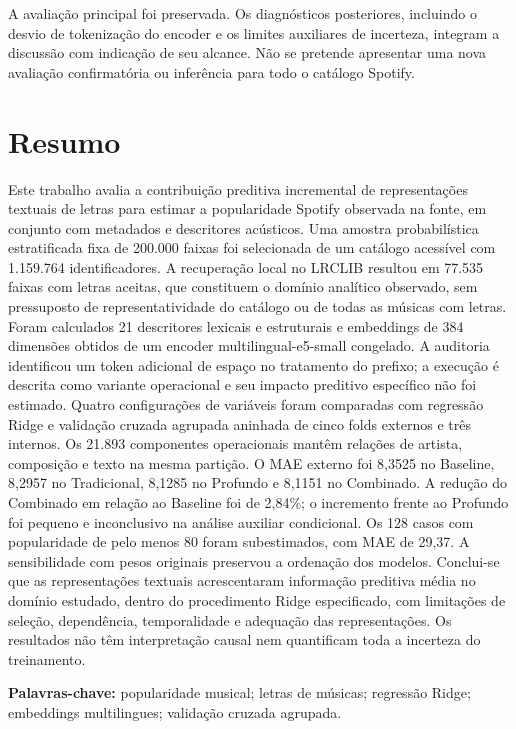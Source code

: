 A avaliação principal foi preservada. Os diagnósticos posteriores, incluindo o desvio de tokenização do encoder e os limites auxiliares de incerteza, integram a discussão com indicação de seu alcance. Não se pretende apresentar uma nova avaliação confirmatória ou inferência para todo o catálogo Spotify.

\chapter*{Resumo}
Este trabalho avalia a contribuição preditiva incremental de representações textuais de letras para estimar a popularidade Spotify observada na fonte, em conjunto com metadados e descritores acústicos. Uma amostra probabilística estratificada fixa de 200.000 faixas foi selecionada de um catálogo acessível com 1.159.764 identificadores. A recuperação local no LRCLIB resultou em 77.535 faixas com letras aceitas, que constituem o domínio analítico observado, sem pressuposto de representatividade do catálogo ou de todas as músicas com letras. Foram calculados 21 descritores lexicais e estruturais e embeddings de 384 dimensões obtidos de um encoder multilingual-e5-small congelado. A auditoria identificou um token adicional de espaço no tratamento do prefixo; a execução é descrita como variante operacional e seu impacto preditivo específico não foi estimado. Quatro configurações de variáveis foram comparadas com regressão Ridge e validação cruzada agrupada aninhada de cinco folds externos e três internos. Os 21.893 componentes operacionais mantêm relações de artista, composição e texto na mesma partição. O MAE externo foi 8,3525 no Baseline, 8,2957 no Tradicional, 8,1285 no Profundo e 8,1151 no Combinado. A redução do Combinado em relação ao Baseline foi de 2,84\%; o incremento frente ao Profundo foi pequeno e inconclusivo na análise auxiliar condicional. Os 128 casos com popularidade de pelo menos 80 foram subestimados, com MAE de 29,37. A sensibilidade com pesos originais preservou a ordenação dos modelos. Conclui-se que as representações textuais acrescentaram informação preditiva média no domínio estudado, dentro do procedimento Ridge especificado, com limitações de seleção, dependência, temporalidade e adequação das representações. Os resultados não têm interpretação causal nem quantificam toda a incerteza do treinamento.

\noindent\textbf{Palavras-chave:} popularidade musical; letras de músicas; regressão Ridge; embeddings multilingues; validação cruzada agrupada.

